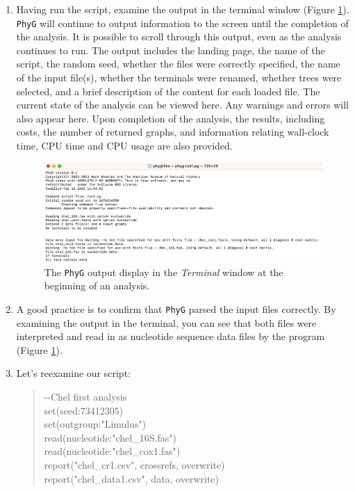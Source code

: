 \documentclass[11pt]{article}
\newcommand{\phyg}{\texttt{PhyG} }
\begin{document}
\begin{enumerate}

\item Having run the script, examine the output in the terminal window 
(Figure \ref{output1}). \phyg will continue to output information to the screen 
until the completion of the analysis. It is possible to scroll through this output, 
even as the analysis continues to run. The output includes the landing page, 
the name of the script, the random seed, whether the files were 
correctly specified, the name of the input file(s), whether the terminals were 
renamed, whether trees were selected, and a brief description of the content 
for each loaded file. The current state of the analysis can be viewed here. Any 
warnings and errors will also appear here. Upon completion of the analysis, the 
results, including costs, the number of returned graphs, and information relating 
wall-clock time, CPU time and CPU usage are also provided.

\begin{figure}
\centering
\includegraphics[width=\textwidth]{output1.png}
\caption{The \phyg output display in the \textit{Terminal} window at the beginning 
of an analysis.}
\label{output1}
\end{figure}

\item A good practice is to confirm that \phyg parsed the input files correctly. 
By examining the output in the terminal, you can see that both files were
interpreted and read in as nucleotide sequence data files by the program 
(Figure \ref{output1}).

\item Let's reexamine our script:

	\begin{quote}
	-\/-Chel first analysis\\
	set(seed:73412305)\\
	set(outgroup:"Limulus")\\
	read(nucleotide:"chel\_16S.fas")\\
	read(nucleotide:"chel\_cox1.fas")\\
	report("chel\_cr1.csv", crossrefs, overwrite)\\
	report("chel\_data1.csv", data, overwrite)\\
	\end{quote}
	

\end{enumerate}
\end{document}
